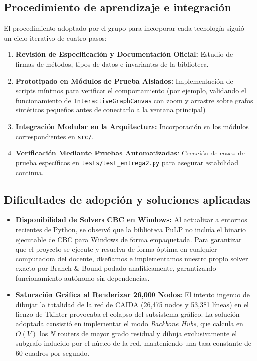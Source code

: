 \documentclass[11pt,a4paper]{article}
\begin{document}
\subsection{Procedimiento de aprendizaje e integración}
El procedimiento adoptado por el grupo para incorporar cada tecnología siguió un ciclo iterativo de cuatro pasos:
\begin{enumerate}[itemsep=1pt]
	\item \textbf{Revisión de Especificación y Documentación Oficial:} Estudio de firmas de métodos, tipos de datos e invariantes de la biblioteca.
	\item \textbf{Prototipado en Módulos de Prueba Aislados:} Implementación de scripts mínimos para verificar el comportamiento (por ejemplo, validando el funcionamiento de \texttt{InteractiveGraphCanvas} con zoom y arrastre sobre grafos sintéticos pequeños antes de conectarlo a la ventana principal).
	\item \textbf{Integración Modular en la Arquitectura:} Incorporación en los módulos correspondientes en \texttt{src/}.
	\item \textbf{Verificación Mediante Pruebas Automatizadas:} Creación de casos de prueba específicos en \texttt{tests/test\_entrega2.py} para asegurar estabilidad continua.
\end{enumerate}

\subsection{Dificultades de adopción y soluciones aplicadas}
\begin{itemize}[itemsep=2pt]
	\item \textbf{Disponibilidad de Solvers CBC en Windows:} Al actualizar a entornos recientes de Python, se observó que la biblioteca PuLP no incluía el binario ejecutable de CBC para Windows de forma empaquetada. Para garantizar que el proyecto se ejecute y resuelva de forma óptima en cualquier computadora del docente, diseñamos e implementamos nuestro propio solver exacto por Branch \& Bound podado analíticamente, garantizando funcionamiento autónomo sin dependencias.
	\item \textbf{Saturación Gráfica al Renderizar 26,000 Nodos:} El intento ingenuo de dibujar la totalidad de la red de CAIDA (26,475 nodos y 53,381 líneas) en el lienzo de Tkinter provocaba el colapso del subsistema gráfico. La solución adoptada consistió en implementar el modo \textit{Backbone Hubs}, que calcula en $O(V)$ los $N$ routers de mayor grado residual y dibuja exclusivamente el subgrafo inducido por el núcleo de la red, manteniendo una tasa constante de 60 cuadros por segundo.
\end{itemize}
\end{document}
